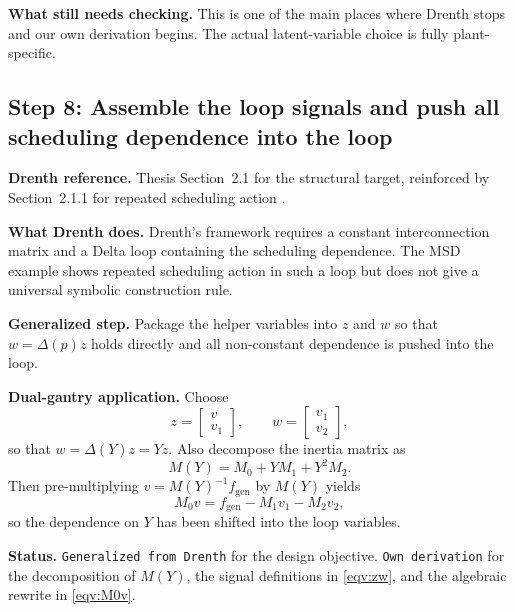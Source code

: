\documentclass[11pt]{article}
\newcommand{\audititem}[2]{\par\smallskip\noindent\textbf{#1.} #2\par}
\newcommand{\statusline}[1]{\texttt{#1}}
\begin{document}
\audititem{What still needs checking}{This is one of the main places where
Drenth stops and our own derivation begins. The actual latent-variable choice is
fully plant-specific.}

\subsection{Step 8: Assemble the loop signals and push all scheduling dependence into the loop}

\audititem{Drenth reference}{Thesis Section~2.1 for the structural target,
reinforced by Section~2.1.1 for repeated scheduling action
\cite{drenth2025thesis}.}

\audititem{What Drenth does}{Drenth's framework requires a constant
interconnection matrix and a Delta loop containing the scheduling dependence.
The MSD example shows repeated scheduling action in such a loop but does not
give a universal symbolic construction rule.}

\audititem{Generalized step}{Package the helper variables into $z$ and $w$ so
that $w=\Delta(p)z$ holds directly and all non-constant dependence is pushed
into the loop.}

\audititem{Dual-gantry application}{Choose
\begin{equation}
    z = \begin{bmatrix} v \\ v_1 \end{bmatrix}, \qquad
    w = \begin{bmatrix} v_1 \\ v_2 \end{bmatrix},
    \label{eqv:zw}
\end{equation}
so that $w = \Delta(Y) z = Y z$. Also decompose the inertia matrix as
\begin{equation}
    M(Y) = M_0 + Y M_1 + Y^2 M_2.
    \label{eqv:decomp}
\end{equation}
Then pre-multiplying $v = M(Y)^{-1} f_{\mathrm{gen}}$ by $M(Y)$ yields
\begin{equation}
    M_0 v = f_{\mathrm{gen}} - M_1 v_1 - M_2 v_2,
    \label{eqv:M0v}
\end{equation}
so the dependence on $Y$ has been shifted into the loop variables.}

\audititem{Status}{\statusline{Generalized from Drenth} for the design
objective. \statusline{Own derivation} for the decomposition of $M(Y)$, the
signal definitions in \eqref{eqv:zw}, and the algebraic rewrite in
\eqref{eqv:M0v}.}
\end{document}

